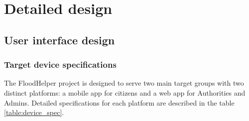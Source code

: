 \documentclass[../Main.tex]{subfiles}
\begin{document}
\section{Detailed design}
\subsection{User interface design}
\subsubsection{Target device specifications}

The FloodHelper project is designed to serve two main target groups with two distinct platforms: a mobile app for citizens and a web app for Authorities and Admins. Detailed specifications for each platform are described in the table \ref{table:device_spec}.
\end{document}
